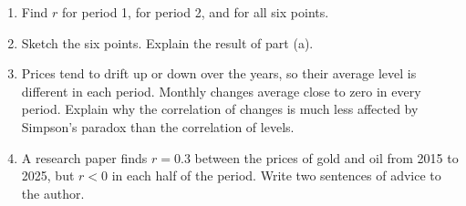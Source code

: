 \documentclass[12pt, twoside]{article}
\begin{document}
\begin{enumerate}[itemsep=0.15cm]
\begin{enumerate}[itemsep=0.1cm]
  \item Find $r$ for period 1, for period 2, and for all six points.
  \vfill
  \item Sketch the six points. Explain the result of part (a).
  \vfill
  \item Prices tend to drift up or down over the years, so their average
  level is different in each period. Monthly changes average close to
  zero in every period. Explain why the correlation of changes is much
  less affected by Simpson's paradox than the correlation of levels.
  \vfill
  \item A research paper finds $r = 0.3$ between the prices of gold and oil
  from 2015 to 2025, but $r < 0$ in each half of the period. Write two
  sentences of advice to the author.
  \vfill
\end{enumerate}

\end{enumerate}
\end{document}
